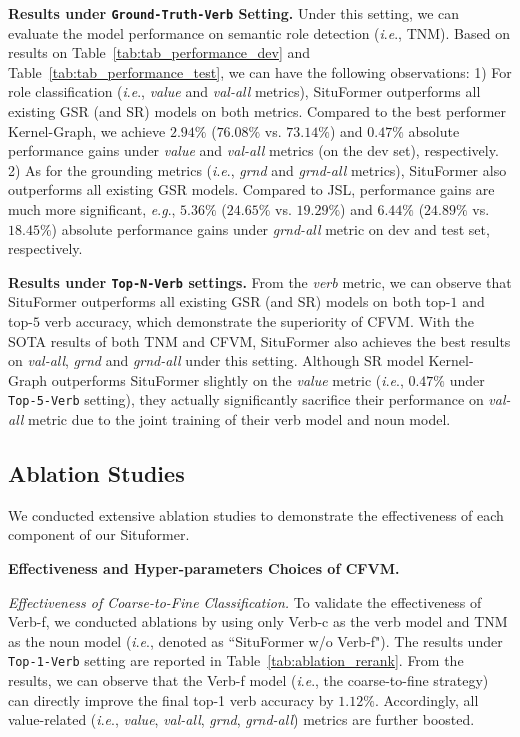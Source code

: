 \documentclass[letterpaper]{article} \usepackage{aaai22}  \usepackage{times}  \usepackage{helvet}  \usepackage{courier}  \usepackage[hyphens]{url}  \usepackage{graphicx} \urlstyle{rm} \def\UrlFont{\rm}  \usepackage{natbib}  \usepackage{caption} \DeclareCaptionStyle{ruled}{labelfont=normalfont,labelsep=colon,strut=off} \frenchspacing  \setlength{\pdfpagewidth}{8.5in}  \setlength{\pdfpageheight}{11in}
\newcommand{\ie}{\textit{i}.\textit{e}.}
\newcommand{\eg}{\textit{e}.\textit{g}.}
\begin{document}
\noindent\textbf{Results under \texttt{Ground-Truth-Verb} Setting.} Under this setting, we can evaluate the model performance on semantic role detection (\ie, TNM). Based on results on Table~\ref{tab:tab_performance_dev} and Table~\ref{tab:tab_performance_test}, we can have the following observations: 1) For role classification (\ie, \emph{value} and \emph{val-all} metrics), SituFormer outperforms all existing GSR (and SR) models on both metrics. Compared to the best performer Kernel-Graph, we achieve $2.94\%$ ($76.08\%$ vs. $73.14\%$) and $0.47\%$ absolute performance gains under \emph{value} and \emph{val-all} metrics (on the dev set), respectively. 2) As for the grounding metrics (\ie, \emph{grnd} and \emph{grnd-all} metrics), SituFormer also outperforms all existing GSR models. Compared to JSL, performance gains are much more significant, \eg, $5.36\%$ ($24.65\%$ vs. $19.29\%$) and $6.44\%$ ($24.89\%$ vs. $18.45\%$) absolute performance gains under \emph{grnd-all} metric on dev and test set, respectively. 



\noindent\textbf{Results under \texttt{Top-N-Verb} settings.} From the \emph{verb} metric, we can observe that SituFormer outperforms all existing GSR (and SR) models on both top-$1$ and top-$5$ verb accuracy, which demonstrate the superiority of CFVM. With the SOTA results of both TNM and CFVM, SituFormer also achieves the best results on \emph{val-all}, \emph{grnd} and \emph{grnd-all} under this setting. Although SR model Kernel-Graph outperforms SituFormer slightly on the \textit{value} metric (\ie, $0.47\%$ under \texttt{Top-5-Verb} setting), they actually significantly sacrifice their performance on \textit{val-all} metric due to the joint training of their verb model and noun model.





\subsection{Ablation Studies}
We conducted extensive ablation studies to demonstrate the effectiveness of each component of our Situformer.


\noindent\textbf{Effectiveness and Hyper-parameters Choices of CFVM.} 

\noindent\emph{Effectiveness of Coarse-to-Fine Classification.}
To validate the effectiveness of Verb-f, we conducted ablations by using only Verb-c as the verb model and TNM as the noun model (\ie, denoted as ``SituFormer w/o Verb-f"). The results under \texttt{Top-1-Verb} setting are reported in Table~\ref{tab:ablation_rerank}. From the results, we can observe that the Verb-f model (\ie, the coarse-to-fine strategy) can directly improve the final top-1 verb accuracy by $1.12\%$. Accordingly, all value-related (\ie, \emph{value}, \emph{val-all}, \emph{grnd}, \emph{grnd-all}) metrics are further boosted. 
\end{document}

